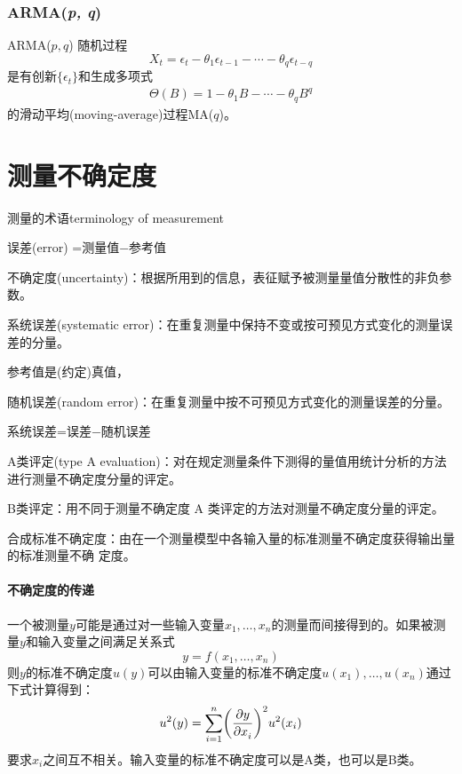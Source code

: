 \subsubsection{ARMA(\textit{p, q})}
\begin{definition}{ARMA($p,q$)}{}
	随机过程
	\[
		X_t=\epsilon_t-\theta_1\epsilon_{t-1}-\cdots-\theta_q\epsilon_{t-q}
	\]
	是有创新$\{\epsilon_t\}$和生成多项式
	\begin{align}
		\Theta(B)=1-\theta_1B-\cdots-\theta_qB^q
	\end{align}
	的滑动平均(moving-average)过程MA($q$)。
\end{definition}

\clearpage
\section{测量不确定度}
\begin{definition}{测量的术语}{terminology of measurement}
	\begin{compactitem}
		\item 误差(error) =测量值$-$参考值
		\item 不确定度(uncertainty)：根据所用到的信息，表征赋予被测量量值分散性的非负参数。
		\item 系统误差(systematic error)：在重复测量中保持不变或按可预见方式变化的测量误差的分量。
		
		参考值是(约定)真值，
		\item 随机误差(random error)：在重复测量中按不可预见方式变化的测量误差的分量。
		
		系统误差=误差$-$随机误差
		\item A类评定(type A evaluation)：对在规定测量条件下测得的量值用统计分析的方法进行测量不确定度分量的评定。
		\item B类评定：用不同于测量不确定度 A 类评定的方法对测量不确定度分量的评定。
		\item 合成标准不确定度：由在一个测量模型中各输入量的标准测量不确定度获得输出量的标准测量不确	定度。
	\end{compactitem}
\end{definition}
\paragraph{不确定度的传递}
一个被测量$ y $可能是通过对一些输入变量$x_1,\ldots,x_n$的测量而间接得到的。如果被测量$ y $和输入变量之间满足关系式
\[
	y=f(x_1,\ldots,x_n)
\]
则$ y $的标准不确定度$ u(y) $可以由输入变量的标准不确定度$u(x_1),\ldots,u(x_n)$通过下式计算得到：
\begin{align}
	u^2(y)=\sum_{i=1}^n\biggl(\frac{\partial^{\;\!\!}y}{\partial x_i^{\;\!\!}}\biggr)^2u^2(x_i)
\end{align}
要求$x_i$之间互不相关。输入变量的标准不确定度可以是A类，也可以是B类。

